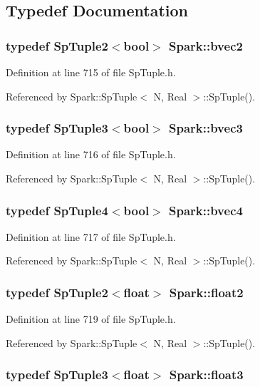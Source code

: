 \subsection{Typedef Documentation}
\subsubsection{\setlength{\rightskip}{0pt plus 5cm}typedef Sp\-Tuple2$<$bool$>$ {\bf Spark::bvec2}}\label{namespaceSpark_a13}


Definition at line 715 of file Sp\-Tuple.h.

Referenced by Spark::Sp\-Tuple$<$ N, Real $>$::Sp\-Tuple().
\subsubsection{\setlength{\rightskip}{0pt plus 5cm}typedef Sp\-Tuple3$<$bool$>$ {\bf Spark::bvec3}}\label{namespaceSpark_a14}


Definition at line 716 of file Sp\-Tuple.h.

Referenced by Spark::Sp\-Tuple$<$ N, Real $>$::Sp\-Tuple().
\subsubsection{\setlength{\rightskip}{0pt plus 5cm}typedef Sp\-Tuple4$<$bool$>$ {\bf Spark::bvec4}}\label{namespaceSpark_a15}


Definition at line 717 of file Sp\-Tuple.h.

Referenced by Spark::Sp\-Tuple$<$ N, Real $>$::Sp\-Tuple().
\subsubsection{\setlength{\rightskip}{0pt plus 5cm}typedef Sp\-Tuple2$<$float$>$ {\bf Spark::float2}}\label{namespaceSpark_a16}


Definition at line 719 of file Sp\-Tuple.h.

Referenced by Spark::Sp\-Tuple$<$ N, Real $>$::Sp\-Tuple().
\subsubsection{\setlength{\rightskip}{0pt plus 5cm}typedef Sp\-Tuple3$<$float$>$ {\bf Spark::float3}}\label{namespaceSpark_a17}


